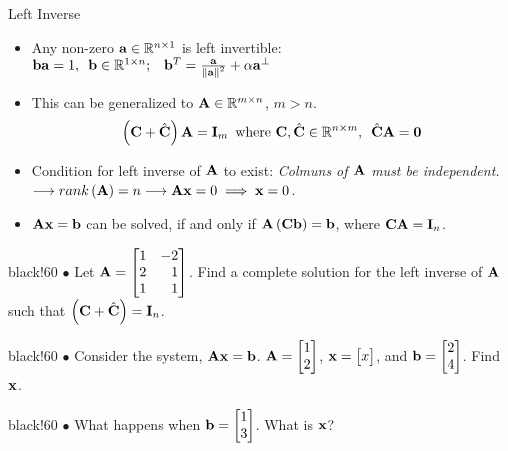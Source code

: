 \documentclass[aspectratio=169]{beamer}
\def\mf{\ensuremath\mathbf}
\def\mb{\ensuremath\mathbb}
\def\lp{\ensuremath\left(}
\def\rp{\ensuremath\right)}
\newcommand{\demoex}[2]{\onslide<#1->\begin{color}{black!60} #2 \end{color}}
\begin{document}
\begin{frame}[t]{Left Inverse}
\vspace{-0.25cm}
\begin{itemize}
    \item Any non-zero $\mf{a} \in \mb{R}^{n \times 1} $ is left invertible: $ \mf{ba} = 1, \,\,\, \mf{b} \in \mb{R}^{1 \times n}; \,\,\,\,\, \mf{b}^T = \frac{\mf{a}}{\left\lVert \mf{a}\right\rVert^2} + \alpha \mf{a}^{\perp} $

    \item This can be generalized to $\mf{A} \in \mb{R}^{m \times n}$, $m > n$.
    \[ \lp \mf{C} + \hat{\mf{C}} \rp \mf{A} = \mf{I}_m \,\,\, \text{where } \mf{C}, \hat{\mf{C}} \in \mb{R}^{n \times m},\,\,\,{ }\hat{\mf{C}}\mf{A} = \mf{0}\]

    \item Condition for left inverse of $\mf{A}$ to exist: \textit{Colmuns of $\mf{A}$ must be independent.} $\longrightarrow rank\left(\mf{A}\right) = n \longrightarrow \mf{Ax} = 0 \implies \mf{x} = 0$.

    \item $\mf{Ax = b}$ can be solved, if and only if $\mf{A}\lp\mf{C}\mf{b}\rp = \mf{b}$, where $\mf{CA} = \mf{I}_n$.
\end{itemize}
\vspace{0.2cm}

\begin{small}
\demoex{2}{
    $\bullet$ Let $\mf{A} = \begin{bmatrix*}[r]1 & -2\\2 & 1\\1 & 1\end{bmatrix*}$. Find a complete solution for the left inverse of $\mf{A}$ such that $\lp\mf{C} + \hat{\mf{C}}\rp = \mf{I}_n$.
}\vspace{0.2cm}

\demoex{3}{
    $\bullet$ Consider the system, $\mf{Ax} = \mf{b}$. $\mf{A} = \begin{bmatrix*}[r]1\\2\end{bmatrix*}$, $\mf{x} = \begin{bmatrix*}x\end{bmatrix*}$, and $\mf{b} = \begin{bmatrix*}2\\4\end{bmatrix*}$. Find $\mf{x}$.
}\vspace{0.2cm}

\demoex{4}{
    $\bullet$ What happens when $\mf{b} = \begin{bmatrix*}1\\3\end{bmatrix*}$. What is $\mf{x}$?
}
\end{small}
\end{frame}
\end{document}

